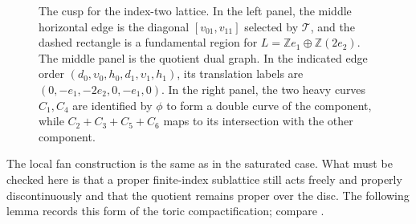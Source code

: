 \begin{figure}[tb]
\caption{The cusp for the index-two lattice.  In the left panel, the middle
horizontal edge is the diagonal $[v_{01},v_{11}]$ selected by
$\mathcal T$, and the dashed
rectangle is a fundamental region for
$L=\mathbb Ze_1\oplus\mathbb Z(2e_2)$.  The middle panel is the quotient
dual graph.  In the indicated edge order
$(d_0,\upsilon_0,h_0,d_1,\upsilon_1,h_1)$, its translation labels are
$(0,-e_1,-2e_2,0,-e_1,0)$.  In the right panel, the two heavy curves
$C_1,C_4$ are identified by $\phi$ to form a double curve of the
component, while $C_2+C_3+C_5+C_6$ maps to its intersection with the other
component.}
\label{fig:cusp-combinatorics}
\end{figure}
\FloatBarrier

The local fan construction is the same as in the saturated case.  What must
be checked here is that a proper finite-index sublattice still acts freely
and properly discontinuously and that the quotient remains proper over the
disc.  The following lemma records this form of the toric compactification;
compare \citep[Theorem~4.5]{Alpoge2026}.

